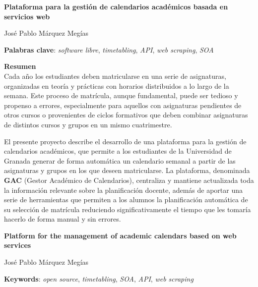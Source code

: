 \thispagestyle{empty}

\begin{center}
{\large\bfseries Plataforma para la gestión de calendarios académicos basada en servicios web}\\
\end{center}
\begin{center}
José Pablo Márquez Megías\\
\end{center}


\vspace{0.5cm}
\noindent\textbf{Palabras clave}: \textit{software libre}, \textit{timetabling}, \textit{API}, \textit{web scraping}, \textit{SOA}
\vspace{0.7cm}

\noindent\textbf{Resumen}\\

Cada año los estudiantes deben matricularse en una serie de asignaturas, organizadas en teoría y prácticas con horarios distribuidos a lo largo de la semana. Este proceso de matrícula, aunque fundamental, puede ser tedioso y propenso a errores, especialmente para aquellos con asignaturas pendientes de otros cursos o provenientes de ciclos formativos que deben combinar asignaturas de distintos cursos y grupos en un mismo cuatrimestre.\newline

El presente proyecto describe el desarrollo de una plataforma para la gestión de calendarios académicos, que permite a los estudiantes de la Universidad de Granada generar de forma automática un calendario semanal a partir de las asignaturas y grupos en los que deseen matricularse. La plataforma, denominada \textbf{GAC} (Gestor Académico de Calendarios), centraliza y mantiene actualizada toda la información relevante sobre la planificación docente, además de aportar una serie de herramientas que permiten a los alumnos la planificación automática de su selección de matrícula reduciendo significativamente el tiempo que les tomaría hacerlo de forma manual y sin errores.\newline
	

\cleardoublepage

\begin{center}
	{\large\bfseries Platform for the management of academic calendars based on web services}\\
\end{center}
\begin{center}
	José Pablo Márquez Megías\\
\end{center}
\vspace{0.5cm}
\noindent\textbf{Keywords}: \textit{open source}, \textit{timetabling}, \textit{SOA}, \textit{API}, \textit{web scraping}
\vspace{0.7cm}

